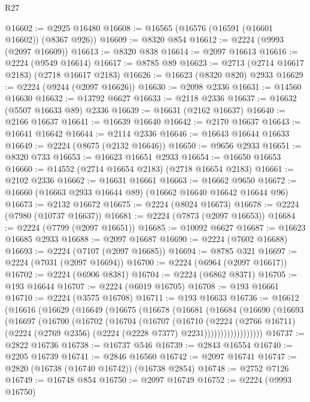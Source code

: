 \begin{lexlean}{R27}
\begin{coremodule}
@16602 := @2925 @16480
@16608 := @16565 (@16576 (@16591 (@16601 @16602)) (@8367 @926))
@16609 := @8320 @854
@16612 := @2224 (@9993 (@2097 @16609))
@16613 := @8320 @838
@16614 := @2097 @16613
@16616 := @2224 (@9549 @16614)
@16617 := @8785 @89
@16623 := @2713 (@2714 @16617 @2183) (@2718 @16617 @2183)
@16626 := @16623 (@8320 @820) @2933
@16629 := @2224 (@9244 (@2097 @16626))
@16630 := @2098 @2336
@16631 := @14560 @16630
@16632 := @13792 @6627
@16633 := @2118 @2336
@16637 := @16632 (@5507 @16633 @89) @2336
@16639 := @16631 (@2162 @16637)
@16640 := @2166 @16637
@16641 := @16639 @16640
@16642 := @2170 @16637
@16643 := @16641 @16642
@16644 := @2114 @2336
@16646 := @16643 @16644 @16633
@16649 := @2224 (@8675 (@2132 @16646))
@16650 := @9656 @2933
@16651 := @8320 @733
@16653 := @16623 @16651 @2933
@16654 := @16650 @16653
@16660 := @14552 (@2714 @16654 @2183) (@2718 @16654 @2183)
@16661 := @2102 @2336
@16662 := @16631 @16661
@16663 := @16662 @9650
@16672 := @16660 (@16663 @2933 @16644 @89) (@16662 @16640 @16642 @16644 @96)
@16673 := @2132 @16672
@16675 := @2224 (@8024 @16673)
@16678 := @2224 (@7980 (@10737 @16637))
@16681 := @2224 (@7873 (@2097 @16653))
@16684 := @2224 (@7799 (@2097 @16651))
@16685 := @10092 @6627
@16687 := @16623 @16685 @2933
@16688 := @2097 @16687
@16690 := @2224 (@7602 @16688)
@16693 := @2224 (@7107 (@2097 @16685))
@16694 := @8785 @321
@16697 := @2224 (@7031 (@2097 @16694))
@16700 := @2224 (@6964 (@2097 @16617))
@16702 := @2224 (@6906 @8381)
@16704 := @2224 (@6862 @8371)
@16705 := @193 @16644
@16707 := @2224 (@6019 @16705)
@16708 := @193 @16661
@16710 := @2224 (@3575 @16708)
@16711 := @193 @16633
@16736 := @16612
    (@16616
      (@16629
        (@16649
          (@16675
            (@16678
              (@16681
                (@16684
                  (@16690
                    (@16693
                      (@16697
                        (@16700
                          (@16702
                            (@16704
                              (@16707
                                (@16710
                                  (@2224
                                    (@2766 @16711)
                                    (@2224
                                      (@2769 @2356)
                                      (@2224 (@2228 @7377) @2231))))))))))))))))))
@16737 := @2822 @16736
@16738 := @16737 @546
@16739 := @2843 @16554
@16740 := @2205 @16739
@16741 := @2846 @16560
@16742 := @2097 @16741
@16747 := @2820 (@16738 (@16740 @16742)) (@16738 @2854)
@16748 := @2752 @7126
@16749 := @16748 @854
@16750 := @2097 @16749
@16752 := @2224 (@9993 @16750)

\end{coremodule}
\end{lexlean}
